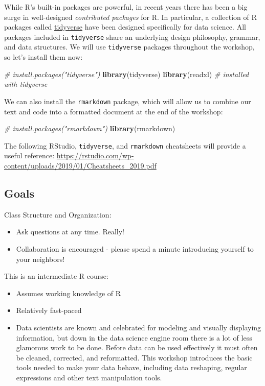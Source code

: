 \documentclass[]{book}
\newenvironment{Shaded}{\begin{snugshade}}{\end{snugshade}}
\newcommand{\KeywordTok}[1]{\textcolor[rgb]{0.13,0.29,0.53}{\textbf{#1}}}
\newcommand{\CommentTok}[1]{\textcolor[rgb]{0.56,0.35,0.01}{\textit{#1}}}
\newcommand{\NormalTok}[1]{#1}
\providecommand{\tightlist}{%
  \setlength{\itemsep}{0pt}\setlength{\parskip}{0pt}}
\begin{document}
While R's built-in packages are powerful, in recent years there has been
a big surge in well-designed \emph{contributed packages} for R. In
particular, a collection of R packages called
\href{https://www.tidyverse.org/}{tidyverse} have been designed
specifically for data science. All packages included in
\texttt{tidyverse} share an underlying design philosophy, grammar, and
data structures. We will use \texttt{tidyverse} packages throughout the
workshop, so let's install them now:

\begin{Shaded}
\begin{Highlighting}[]
\CommentTok{# install.packages("tidyverse")}
\KeywordTok{library}\NormalTok{(tidyverse)}
\KeywordTok{library}\NormalTok{(readxl) }\CommentTok{# installed with tidyverse}
\end{Highlighting}
\end{Shaded}

We can also install the \texttt{rmarkdown} package, which will allow us
to combine our text and code into a formatted document at the end of the
workshop:

\begin{Shaded}
\begin{Highlighting}[]
\CommentTok{# install.packages("rmarkdown")}
\KeywordTok{library}\NormalTok{(rmarkdown)}
\end{Highlighting}
\end{Shaded}

The following RStudio, \texttt{tidyverse}, and \texttt{rmarkdown}
cheatsheets will provide a useful reference:
\url{https://rstudio.com/wp-content/uploads/2019/01/Cheatsheets_2019.pdf}

\subsection{Goals}\label{goals-2}

Class Structure and Organization:

\begin{itemize}
\tightlist
\item
  Ask questions at any time. Really!
\item
  Collaboration is encouraged - please spend a minute introducing
  yourself to your neighbors!
\end{itemize}

This is an intermediate R course:

\begin{itemize}
\tightlist
\item
  Assumes working knowledge of R
\item
  Relatively fast-paced
\item
  Data scientists are known and celebrated for modeling and visually
  displaying information, but down in the data science engine room there
  is a lot of less glamorous work to be done. Before data can be used
  effectively it must often be cleaned, corrected, and reformatted. This
  workshop introduces the basic tools needed to make your data behave,
  including data reshaping, regular expressions and other text
  manipulation tools.
\end{itemize}
\end{document}
